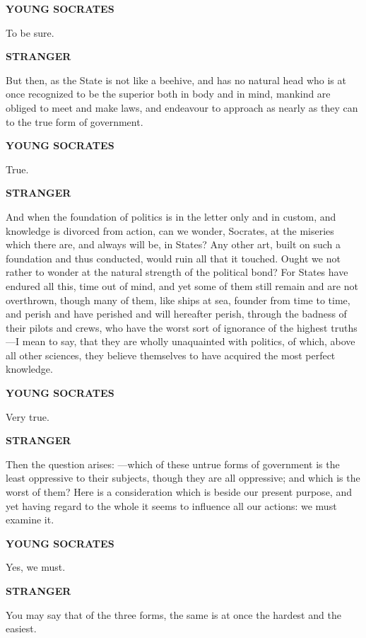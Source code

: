 \documentclass[11pt,letter]{article}
\begin{document}
\par \textbf{YOUNG SOCRATES}
\par   To be sure.

\par \textbf{STRANGER}
\par   But then, as the State is not like a beehive, and has no natural head who is at once recognized to be the superior both in body and in mind, mankind are obliged to meet and make laws, and endeavour to approach as nearly as they can to the true form of government.

\par \textbf{YOUNG SOCRATES}
\par   True.

\par \textbf{STRANGER}
\par   And when the foundation of politics is in the letter only and in custom, and knowledge is divorced from action, can we wonder, Socrates, at the miseries which there are, and always will be, in States? Any other art, built on such a foundation and thus conducted, would ruin all that it touched. Ought we not rather to wonder at the natural strength of the political bond? For States have endured all this, time out of mind, and yet some of them still remain and are not overthrown, though many of them, like ships at sea, founder from time to time, and perish and have perished and will hereafter perish, through the badness of their pilots and crews, who have the worst sort of ignorance of the highest truths—I mean to say, that they are wholly unaquainted with politics, of which, above all other sciences, they believe themselves to have acquired the most perfect knowledge.

\par \textbf{YOUNG SOCRATES}
\par   Very true.

\par \textbf{STRANGER}
\par   Then the question arises: —which of these untrue forms of government is the least oppressive to their subjects, though they are all oppressive; and which is the worst of them? Here is a consideration which is beside our present purpose, and yet having regard to the whole it seems to influence all our actions:  we must examine it.

\par \textbf{YOUNG SOCRATES}
\par   Yes, we must.

\par \textbf{STRANGER}
\par   You may say that of the three forms, the same is at once the hardest and the easiest.
\end{document}
